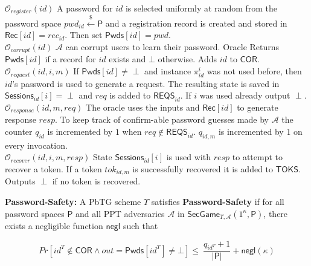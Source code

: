 \documentclass[conference]{IEEEtran}
\newcommand{\cA}{\mathcal{A}}
\newcommand{\cO}{\mathcal{O}}
\newcommand{\secparameter}{\kappa}
\newcommand{\pwd}{pwd}
\newcommand{\uid}{id}
\newcommand{\sP}{\mathsf{P}}
\begin{document}
\begin{multicols}{2}
\raggedright
\scriptsize
{}\\
\noindent \underline{$\cO_{register}(\uid)$} %
A password for $\uid$ is selected uniformly at random from the password space $\pwd_{\uid} \xleftarrow{\$} \sP$ and a registration record is created and stored in $\mathsf{Rec}[\uid] = rec_{\uid}$. Then set $\mathsf{Pwds}[\uid] = \pwd$.\\     
\noindent \underline{$\cO_{corrupt}(\uid)$} %
$\cA$ can corrupt users to learn their password. { Oracle} Returns $\mathsf{Pwds}[\uid]$ if a record for $\uid$ exists and $\bot$ otherwise. Adds $\uid$ to $\mathsf{COR}$.\\ 
\noindent \underline{$\cO_{request}(\uid,i,m)$} %
If $\mathsf{Pwds}[\uid] \neq \perp$ and instance $\pi^{i}_{\uid}$ was not used before, then $\uid$'s password is used to generate a request. The resulting state is saved in $\mathsf{Sessions}_{\uid}[i] = \perp$ and $req$ is added to $\mathsf{REQS}_{\uid}$. If $i$ was used already output $\perp$.\\
\noindent \underline{$\cO_{response}(\uid,m,req)$} %
The oracle uses the inputs and $\mathsf{Rec}[\uid]$ to generate response $resp$. To keep track of confirm-able password guesses made by $\cA$ the counter $q_{\uid}$ is incremented by $1$ when $req \notin \mathsf{REQS}_{\uid}$. $q_{\uid,m}$ is incremented by $1$ on every invocation.\\
\noindent \underline{$\cO_{recover}(\uid,i,m,resp)$} %
State $\mathsf{Sessions}_{\uid}[i]$ is used with $resp$ to attempt to recover a token. If a token $tok_{\uid,m}$ is successfully recovered it is added to $\mathsf{TOKS}$. Outputs $\perp$ if no token is recovered.
\end{multicols}



\noindent
{\bf Password-Safety:}
    \label{def:password_safety_PbTG} 
    A PbTG scheme $\Upsilon$ satisfies \textbf{Password-Safety} if for all password spaces $\sP$ and all PPT adversaries $\cA$ in $\mathsf{SecGame}_{\Upsilon,\cA}(1^{\secparameter},\sP)$, there exists a negligible function $\mathsf{negl}$ such that
    
    \[Pr[ \uid^{T} \notin \mathsf{COR} \land out = \mathsf{Pwds}[\uid^{T}] \neq \bot] \leq ~ \frac{q_{\uid^T} + 1}{|\sP|} + \mathsf{negl}(\secparameter)\]
\end{document}
